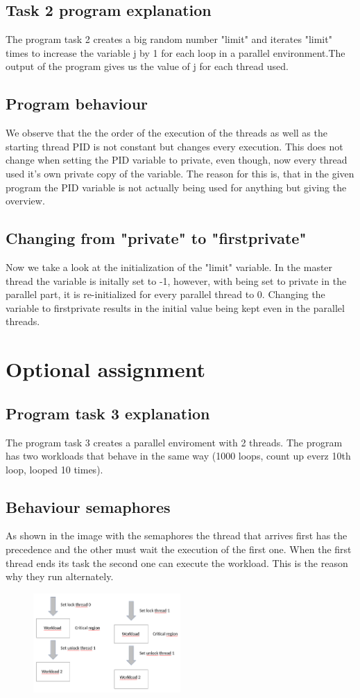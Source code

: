 \documentclass[11pt,a4paper]{article}
\begin{document}
\subsection{Task 2 program explanation}
The program task 2 creates a big random number "limit" and iterates "limit" times to increase the variable j by 1 for each loop in a parallel environment.The output of the program gives us the value of j for each thread used. 
\subsection{Program behaviour}
We observe that the the order of the execution of the threads as well as the starting thread PID is not constant but changes every execution. This does not change when setting the PID variable to private, even though, now every thread used it's own private copy of the variable. The reason for this is, that in the given program the PID variable is not actually being used for anything but giving the overview.
\subsection{Changing from "private" to "firstprivate"}
Now we take a look at the initialization of the "limit" variable. In the master thread the variable is initally set to -1, however, with being set to private in the parallel part, it is re-initialized for every parallel thread to 0. Changing the variable to firstprivate results in the initial value being kept even in the parallel threads.
\newpage
\section{Optional assignment}
\subsection{Program task 3 explanation}
The program task 3 creates a parallel enviroment with 2 threads. The program has two workloads that behave in the same way (1000 loops, count up everz 10th loop, looped 10 times).
\subsection{Behaviour semaphores}
As shown in the image with the semaphores the thread that arrives first has the precedence and the other must wait the execution of the first one. When the first thread ends its task the second one can execute the workload. This is the reason why they run alternately. 
\begin{figure}[h]
\centering
\includegraphics[width=0.5\textwidth]{foto/sem_explanation.png}
\end{figure}
\end{document}
